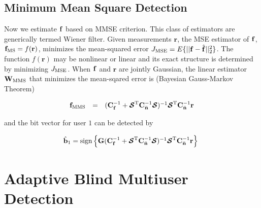 \documentclass[a4paper,10pt,fleqn, twocolumn]{IEEETran}
\newcommand{\br}{{\mathbf r}}
\newcommand{\bb}{{\bf b}}
\newcommand{\bC}{{\bf C}}
\newcommand{\bG}{{\bf G}}
\newcommand{\bn}{{\bf n}}
\newcommand{\bbf}{{\bf f}}
\newcommand{\bW}{{\bf W}}
\newcommand{\bcS}{{\mbox {\boldmath ${\cal S}$}}}
\begin{document}
\subsection{Minimum Mean Square Detection}
Now we estimate $\bbf$ based on MMSE criterion. This class of
estimators are generically termed Wiener filter. Given
measurements $\br$, the MSE estimator of $\bbf$, ${\bbf}_{\rm MS}
= f( \br )$, minimizes the mean-squared error $J_{\rm
MSE}=E\{||\bbf-\hat{\bbf}||_2^2\}$. The function $f(\br)$ may be
nonlinear or linear and its exact structure is determined by
minimizing $J_{\rm MSE}$. When $\bbf$ and $\br$ are jointly
Gaussian, the linear estimator $\bW_{\rm MMS}$ that minimizes the
mean-sqared error is (Bayesian Gauss-Markov Theorem)

\begin{equation}
\begin{array}{rcl}
{\bbf}_{\rm MMS}&=&(\bC_{\bbf}^{-1}+\bcS^{\rm
T}\bC_{\bar{\bn}}^{-1}\bcS)^{-1}\bcS^{\rm
T}\bC_{\bar{\bn}}^{-1}\br
\end{array} \label{MSE}
\end{equation}

\noindent and the bit vector for user $1$ can be detected by

\begin{equation}\hspace{-0.05in}
\begin{array}{l}
\hat{\bb}_1=\mbox{sign}\left\{\bG(\bC_{\bbf}^{-1}+\bcS^{\rm
T}\bC_{\bar{\bn}}^{-1}\bcS)^{-1}\bcS^{\rm
T}\bC_{\bar{\bn}}^{-1}\br\right\}
\end{array}
\end{equation}

\section{ Adaptive Blind Multiuser Detection}

\begin{figure}
\label{AMUDstruct}
\end{figure}
\end{document}
